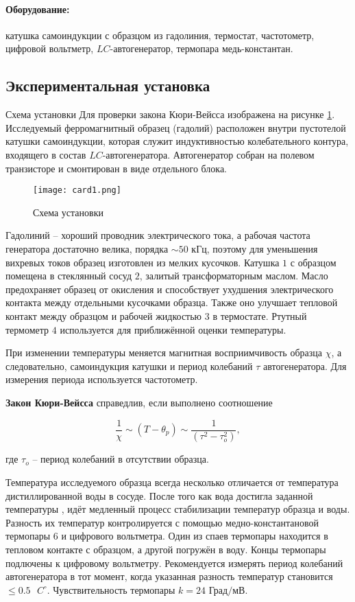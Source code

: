 \documentclass[a4paper,12pt]{article} %
\begin{document}
\paragraph{Оборудование:} катушка самоиндукции с образцом из гадолиния, термостат, частотометр, цифровой вольтметр, $LC$-автогенератор, термопара медь-константан.

\subsection{Экспериментальная установка}

Схема установки Для проверки закона Кюри-Вейсса изображена на рисунке \ref{img1}. Исследуемый ферромагнитный образец (гадолий) расположен внутри пустотелой катушки самоиндукции, которая служит индуктивностью колебательного контура, входящего в состав $LC$-автогенератора. Автогенератор собран на полевом транзисторе и смонтирован в виде отдельного блока.

\begin{figure}[h]
\begin{center}
		\texttt{[image: card1.png]}
\end{center}
	\caption{Схема установки}
	\label{img1}
\end{figure}

Гадолиний -- хороший проводник электрического тока, а рабочая частота генератора достаточно велика, порядка $\sim 50 \text{ кГц}$, поэтому для уменьшения вихревых токов образец изготовлен из мелких кусочков. Катушка $1$ с образцом помещена в стеклянный сосуд $2$, залитый трансформаторным маслом. Масло предохраняет образец от окисления и способствует ухудшения электрического контакта между отдельными кусочками образца. Также оно улучшает тепловой контакт между образцом и рабочей жидкостью $3$ в термостате. Ртутный термометр $4$ используется для приближённой оценки температуры.

При изменении температуры меняется магнитная восприимчивость образца $\chi$, а следовательно, самоиндукция катушки и период колебаний $\tau$ автогенератора. Для измерения периода используется частотометр.

\textbf{Закон Кюри-Вейсса} справедлив, если выполнено соотношение 

\[ \frac{1}{\chi} \sim (T - \theta_{p}) \sim \frac{1}{(\tau^2-\tau^2_{o})}, \]

где $\tau_{o}$ -- период колебаний в отсутствии образца.

Температура исследуемого образца всегда несколько отличается от температура дистиллированной воды в сосуде. После того как вода достигла заданной температуры , идёт медленный процесс стабилизации температур образца и воды. Разность их температур контролируется с помощью медно-константановой термопары $6$ и цифрового вольтметра. Один из спаев термопары находится в тепловом контакте с образцом, а другой погружён в воду. Концы термопары подлючены к цифровому вольтметру. Рекомендуется измерять период колебаний автогенератора в тот момент, когда указанная разность температур становится $\leq0.5 \text{ } C^{\circ}$. Чувствительность термопары $k = 24 \text{ Град}/\text{мВ}.$
\end{document}
